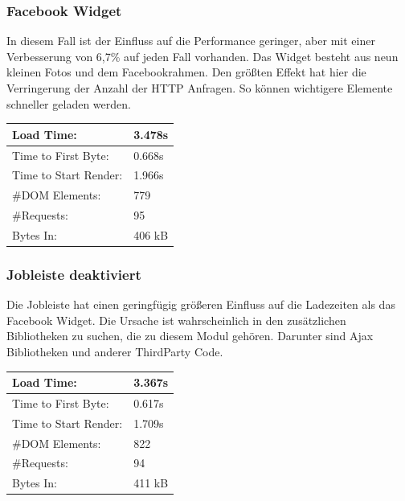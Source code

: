 \subsubsection{Facebook Widget} In diesem Fall ist der Einfluss auf die Performance geringer, aber mit einer Verbesserung von 6,7\% auf jeden Fall vorhanden. Das Widget besteht aus neun kleinen Fotos und dem Facebookrahmen. Den größten Effekt hat hier die Verringerung der Anzahl der HTTP Anfragen. So können wichtigere Elemente schneller geladen werden.

\begin{table}
\caption{Ergebnis der Deaktivierung des Facebook-Widgets}
    \begin{longtable}{ | p{3cm} | p{1.5cm} | }
    \hline
    Load Time: 			& 3.478s 	\\ \hline
    Time to First Byte:		& 0.668s  	\\ \hline
    Time to Start Render:	& 1.966s	\\ \hline
    \#DOM Elements:		& 779 		\\ \hline
    \#Requests:			& 95 		\\ \hline
    Bytes In:			& 406 kB 	\\ \hline
    \hline
    \end{longtable}
\end{table}

\subsubsection{Jobleiste deaktiviert} Die Jobleiste hat einen geringfügig größeren Einfluss auf die Ladezeiten als das Facebook Widget. Die Ursache ist wahrscheinlich in den zusätzlichen Bibliotheken zu suchen, die zu diesem Modul gehören. Darunter sind Ajax Bibliotheken und anderer ThirdParty Code.

\begin{table}
\caption{Ergebnis der Deaktivierung der Jobleiste}
    \begin{longtable}{ | p{3cm} | p{1.5cm} | }
    \hline
    Load Time: 			& 3.367s 	\\ \hline
    Time to First Byte:		& 0.617s  	\\ \hline
    Time to Start Render:	& 1.709s	\\ \hline
    \#DOM Elements:		& 822 		\\ \hline
    \#Requests:			& 94 		\\ \hline
    Bytes In:			& 411 kB 	\\ \hline
    \hline
    \end{longtable}
\end{table}

